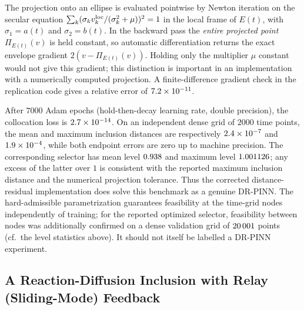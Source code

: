 \documentclass[11pt]{elsarticle}
\theoremstyle{definition}
\theoremstyle{remark}
\numberwithin{equation}{section}
\begin{document}
The projection onto an ellipse is evaluated pointwise by Newton iteration on
the secular equation
$\sum_k(\sigma_k v_k^{\rm loc}/(\sigma_k^2+\mu))^2=1$ in the local frame of
$E(t)$, with $\sigma_1=a(t)$ and $\sigma_2=b(t)$. In the backward pass the
\emph{entire projected point} $\Pi_{E(t)}(v)$ is held constant, so automatic
differentiation returns the exact envelope gradient
$2(v-\Pi_{E(t)}(v))$. Holding only the multiplier $\mu$ constant would not
give this gradient; this distinction is important in an implementation with
a numerically computed projection. A finite-difference gradient check in the
replication code gives a relative error of $7.2\times10^{-11}$.

After $7000$ Adam epochs (hold-then-decay learning rate, double precision),
the collocation loss is $2.7\times10^{-14}$. On an independent dense grid of
$2000$ time points, the mean and maximum inclusion distances are respectively
$2.4\times10^{-7}$ and $1.9\times10^{-4}$, while both endpoint errors are zero
up to machine precision. The corresponding selector has mean level $0.938$
and maximum level $1.001126$; any excess of the latter over $1$ is
consistent with the reported maximum inclusion distance and the numerical
projection tolerance. Thus
the corrected distance-residual implementation does solve this benchmark as
a genuine DR-PINN. The hard-admissible parametrization guarantees
feasibility at the time-grid nodes independently of training; for the
reported optimized selector, feasibility between nodes was additionally
confirmed on a dense validation grid of $20\,001$ points (cf.\ the level
statistics above). It should not itself be labelled a DR-PINN experiment.

\subsection{A Reaction-Diffusion Inclusion with Relay (Sliding-Mode) Feedback}
\label{subsec:parabolic-PDI}
\end{document}
